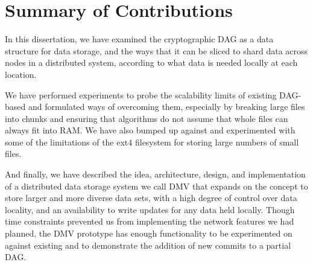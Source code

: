 \section{Summary of Contributions}


In this dissertation, we have examined the cryptographic \acrfull{DAG} as a data
structure for data storage, and the ways that it can be sliced to shard data
across nodes in a distributed system, according to what data is needed locally
at each location.

We have performed experiments to probe the scalability limits of existing
\gls{DAG}-based  and formulated ways of overcoming them,
especially by breaking large files into chunks and ensuring that algorithms do
not assume that whole files can always fit into RAM. We have also bumped up
against and experimented with
some of the limitations of the ext4 filesystem for
storing large numbers of small files.

And finally, we have described the idea, architecture, design, and
implementation of a distributed data storage system we call \gls{DMV} that
expands on the  concept to store
larger and more diverse data sets, with a high degree of control over data
locality, and an availability to write updates for any data held locally. Though
time constraints prevented us from implementing the network features we had
planned, the \gls{DMV} prototype has enough functionality to be experimented on
against existing  and to demonstrate the addition of new
\glspl{commit} to a partial \gls{DAG}.
